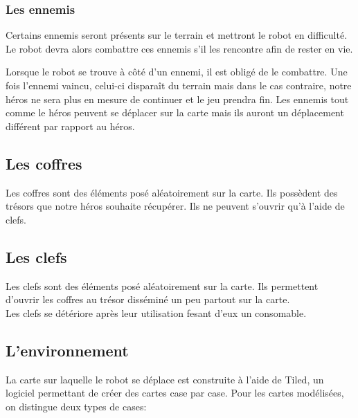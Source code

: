 \documentclass[a4paper 12pts]{article}
\begin{document}
\vspace{0.75cm}

\subsubsection{Les ennemis}


Certains ennemis seront présents sur le terrain et mettront le robot en difficulté. 
Le robot devra alors combattre ces ennemis s'il les rencontre afin de rester en vie.

Lorsque le robot se trouve à côté d'un ennemi, il est obligé de le combattre. 
Une fois l'ennemi vaincu, celui-ci disparaît du terrain mais dans le cas contraire, 
notre héros ne sera plus en mesure de continuer et le jeu prendra fin.
Les ennemis tout comme le héros peuvent se déplacer sur la carte mais ils auront un déplacement différent par rapport au héros.



\newpage
\subsection{Les coffres}


\vspace{0.75cm}

Les coffres sont des éléments posé aléatoirement sur la carte. Ils possèdent des trésors que notre héros souhaite récupérer.
Ils ne peuvent s'ouvrir qu'à l'aide de clefs.


\vspace{0.75cm}

\subsection{Les clefs}

\vspace{0.75cm}

Les clefs sont des éléments posé aléatoirement sur la carte. Ils permettent d'ouvrir les coffres au trésor disséminé un peu partout sur la carte.\\
Les clefs se détériore après leur utilisation fesant d'eux un consomable.


\vspace{0.75cm}


\subsection{L'environnement}
La carte sur laquelle le robot se déplace est construite à l'aide de Tiled, un logiciel permettant de créer des cartes case par case. 
Pour les cartes modélisées, on distingue deux types de cases:
\end{document}
